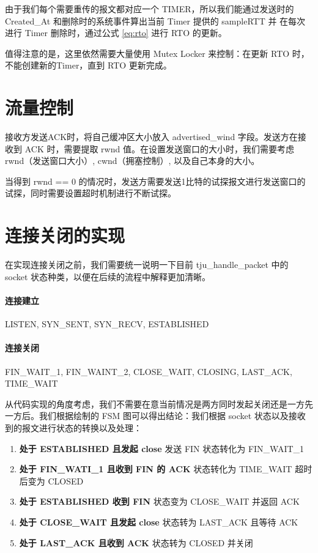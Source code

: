 由于我们每个需要重传的报文都对应一个 TIMER，所以我们能通过发送时的 Created\_At 和删除时的系统事件算出当前 Timer 提供的 sampleRTT 并 在每次进行 Timer 删除时，通过公式 \ref{eq:rto} 进行 RTO 的更新。

值得注意的是，这里依然需要大量使用 Mutex Locker 来控制：在更新 RTO 时，不能创建新的Timer，直到 RTO 更新完成。

\section{流量控制}

接收方发送ACK时，将自己缓冲区大小放入 advertised\_wind 字段。发送方在接收到 ACK 时，需要提取 rwnd 值。在设置发送窗口的大小时，我们需要考虑 rwnd（发送窗口大小）, cwnd（拥塞控制）, 以及自己本身的大小。

当得到 rwnd == 0 的情况时，发送方需要发送1比特的试探报文进行发送窗口的试探，同时需要设置超时机制进行不断试探。

\section{连接关闭的实现}

在实现连接关闭之前，我们需要统一说明一下目前 tju\_handle\_packet 中的 socket 状态种类，以便在后续的流程中解释更加清晰。

\paragraph*{连接建立} LISTEN, SYN\_SENT, SYN\_RECV, ESTABLISHED
\paragraph*{连接关闭} FIN\_WAIT\_1, FIN\_WAINT\_2, CLOSE\_WAIT, CLOSING, LAST\_ACK, TIME\_WAIT 

从代码实现的角度考虑，我们不需要在意当前情况是两方同时发起关闭还是一方先一方后。我们根据绘制的 FSM 图可以得出结论：我们根据 socket 状态以及接收到的报文进行状态的转换以及处理：

\begin{enumerate}
    \item \textbf{处于 ESTABLISHED 且发起 close} 发送 FIN 状态转化为 FIN\_WAIT\_1
    \item \textbf{处于 FIN\_WATI\_1 且收到 FIN 的 ACK} 状态转化为 TIME\_WAIT 超时后变为 CLOSED
    \item \textbf{处于 ESTABLISHED 收到 FIN} 状态变为 CLOSE\_WAIT 并返回 ACK 
    \item \textbf{处于 CLOSE\_WAIT 且发起 close} 状态转为 LAST\_ACK 且等待 ACK 
    \item \textbf{处于 LAST\_ACK 且收到 ACK} 状态转为 CLOSED 并关闭
\end{enumerate}

